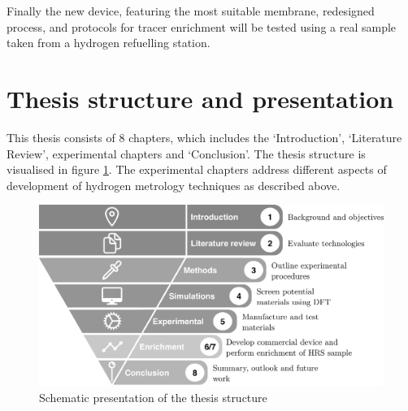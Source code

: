 Finally the new device, featuring the most suitable membrane, redesigned process, and protocols for tracer enrichment will be tested using a real sample taken from a hydrogen refuelling station.

\section{Thesis structure and presentation}
This thesis consists of 8 chapters, which includes the ‘Introduction’, ‘Literature Review’, 
experimental chapters and ‘Conclusion’. The thesis structure is visualised in figure \ref{funnel}. 
The experimental chapters address different aspects of development of hydrogen metrology techniques as 
described above. 

\begin{figure}[H]
  \includegraphics[width=\linewidth]{figures/funnel.png}
  \caption{Schematic presentation of the thesis structure}
  \label{funnel}
\end{figure}


\renewcommand{\bibname}{References}

